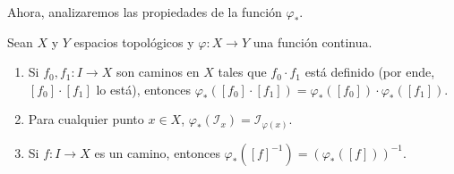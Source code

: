 \documentclass[12pt]{report}
\theoremstyle{largebreak}
\newcommand\cf[3]{\ensuremath{#1:#2\rightarrow#3}}
\begin{document}
    Ahora, analizaremos las propiedades de la función $\varphi_*$.
    
    \renewcommand{\theenumi}{\roman{enumi}}

    \begin{propo}
        Sean $X$ y $Y$ espacios topológicos y $\cf{\varphi}{X}{Y}$ una función continua.
        \begin{enumerate}
            \item Si $\cf{f_0,f_1}{I}{X}$ son caminos en $X$ tales que $f_0\cdot f_1$ está definido (por ende, $[f_0]\cdot [f_1]$ lo está), entonces $\varphi_*([f_0]\cdot[f_1])=\varphi_*([f_0])\cdot\varphi_*([f_1])$.
            \item Para cualquier punto $x\in X$, $\varphi_*(\mathscr{I}_x)=\mathscr{I}_{\varphi(x)}$.
            \item Si $\cf{f}{I}{X}$ es un camino, entonces $\varphi_*([f]^{-1})=(\varphi_*([f]))^{-1}$.
        \end{enumerate}
    \end{propo}
\end{document}
